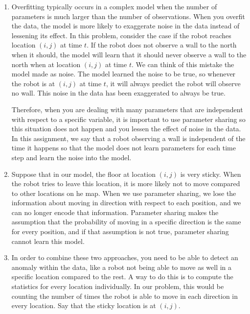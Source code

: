 \documentclass[11pt,a4paper]{article}
\begin{document}
	\begin{enumerate}
		\item Overfitting typically occurs in a complex model when the number of
		parameters is much larger than the number of observations. When you overfit
		the data, the model is more likely to exaggerate noise in the data instead of
		lessening its effect. In this problem, consider the case if the robot reaches
		location $(i,j)$ at time $t$. If the robot does not observe a wall to the north
		when it should, the model will learn that it should never observe a wall to the north
		when at location $(i,j)$ at time $t$. We can think of this mistake the model made
		as noise. The model learned the noise to be true, so whenever the robot is at
		$(i,j)$ at time $t$, it will always predict the robot will observe no wall. This noise
		in the data has been exaggerated to always be true. 
		
		Therefore, when you are dealing with many parameters that are independent with respect
		to a specific variable, it is important to use parameter sharing so this situation 
		does not happen and you lessen the effect of noise in the data. In this assignment,
		we say that a robot observing a wall is independent of the time it happens so that
		the model does not learn parameters for each time step and learn the noise into
		the model.
		
		\item Suppose that in our model, the floor at location $(i,j)$ is very sticky. When
		the robot tries to leave this location, it is more likely not to move compared to
		other locations on he map. When we use parameter sharing, we lose the information
		about moving in direction with respect to each position, and we can no longer encode
		that information. Parameter sharing makes the assumption that the probability of moving
		in a specific direction is the same for every position, and if that assumption is not true,
		parameter sharing cannot learn this model.
		
		\item In order to combine these two approaches, you need to be able to detect an 
		anomaly within the data, like a robot not being able to move as well in a specific location
		compared to the rest. A way to do this is to compute the statistics for every location
		individually. In our problem, this would be counting the number of times the robot
		is able to move in each direction in every location. Say that the sticky location
		is at $(i,j)$. 
		

\end{enumerate}
\end{document}
